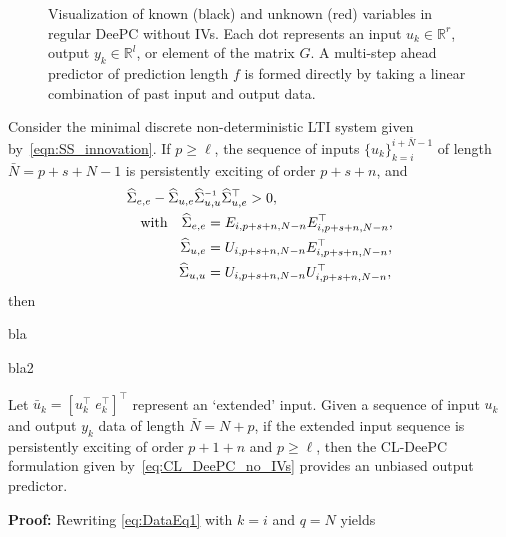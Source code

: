 \begin{figure}[b!]
\centering

\caption{Visualization of known (black) and unknown (red) variables in regular \ac{DeePC} without \ac{IVs}. Each dot represents an input $u_k\in\mathbb{R}^r$, output $y_k\in\mathbb{R}^l$, or element of the matrix $G$. A multi-step ahead predictor of prediction length $f$ is formed directly by taking a linear combination of past input and output data.\\\vspace{0.75mm}}
\label{fig:regular-DeePC}
\end{figure}
%
\setcounter{thm}{0}
\begin{thm}\label{theorem:main_result}
    Consider the minimal discrete non-deterministic \ac{LTI} system given by~\eqref{eqn:SS_innovation}. If $p\geq\ell$, the sequence of inputs $\{u_k\}_{k=i}^{i+\bar{N}-1}$ of length $\bar{N}=p+s+N-1$ is persistently exciting of order $p+s+n$, and %
    \begin{alignat}{2}%
    &\widehat{\Sigma}_{e,e} - \widehat{\Sigma}_{u,e} \widehat{\Sigma}_{u,u}\inv \widehat{\Sigma}_{u,e}^\top>0,\span\span\label{eq:PE_corUE2}\\
    &&\text{with}\quad\widehat{\Sigma}_{e,e}&=E_{i,p+s+n,N-n}E_{i,p+s+n,N-n}^\top,\notag\\
    &&\widehat{\Sigma}_{u,e}&=U_{i,p+s+n,N-n}E_{i,p+s+n,N-n}^\top,\notag\\
    &&\widehat{\Sigma}_{u,u}&=U_{i,p+s+n,N-n}U_{i,p+s+n,N-n}^\top,\notag
    \end{alignat}
    then
    \begin{claim}
        \item bla
        \item bla2
    \end{claim}
    
    Let $\bar{u}_k=\left[u_k^\top \; e_k^\top\right]^\top$ represent an `extended' input. Given a sequence of input $u_k$ and output $y_k$ data of length $\bar{N}=N+p$, if the extended input sequence is persistently exciting of order $p+1+n$ and $p\geq\ell$, then the \ac{CL-DeePC} formulation given by~\eqref{eq:CL_DeePC_no_IVs} provides an unbiased output predictor.%
\end{thm}
\textbf{Proof:} 
Rewriting \eqref{eq:DataEq1} with $k=i$ and $q=N$ yields
